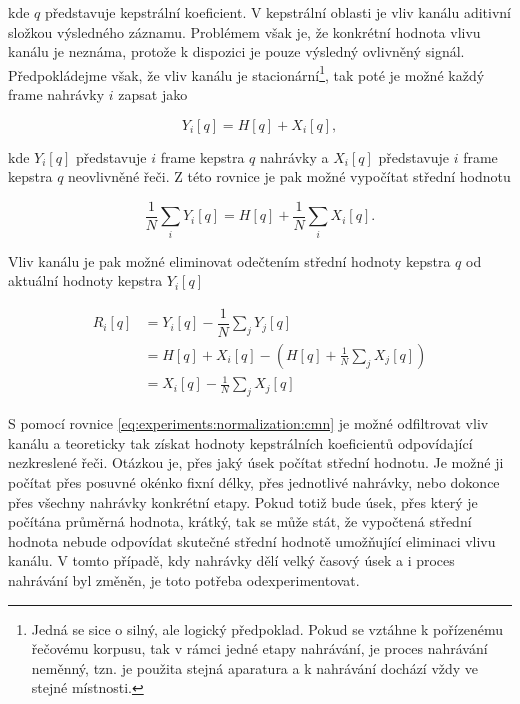 \noindent kde $q$ představuje kepstrální koeficient. V kepstrální oblasti je vliv kanálu aditivní složkou výsledného záznamu. Problémem však je, že konkrétní hodnota vlivu kanálu je neznáma, protože k dispozici je pouze výsledný ovlivněný signál. Předpokládejme však, že vliv kanálu je stacionární\footnote{Jedná se sice o silný, ale logický předpoklad. Pokud se vztáhne k pořízenému řečovému korpusu, tak v rámci jedné etapy nahrávání, je proces nahrávání neměnný, tzn. je použita stejná aparatura a k nahrávání dochází vždy ve stejné místnosti.}, tak poté je možné každý frame nahrávky $i$ zapsat jako

\begin{equation}
  Y_i\left[q\right] = H\left[q\right] + X_i\left[q\right],
\end{equation}

\noindent kde $Y_i\left[q\right]$ představuje $i$ frame kepstra $q$ nahrávky a $X_i\left[q\right]$ představuje $i$ frame kepstra $q$ neovlivněné řeči. Z této rovnice je pak možné vypočítat střední hodnotu

\begin{equation}
  \frac{1}{N} \sum_i Y_i\left[q\right] = H\left[q\right] + \frac{1}{N} \sum_i X_i\left[q\right].
\end{equation}

\noindent Vliv kanálu je pak možné eliminovat odečtením střední hodnoty kepstra $q$ od aktuální hodnoty kepstra $Y_i\left[q\right]$

\begin{align}
  R_i\left[q\right] &= Y_i\left[q\right] - \dfrac{1}{N}\sum_{j} Y_j\left[q\right] \nonumber  \\
  &= H\left[q\right] + X_i\left[q\right] - \left( H\left[q\right] + \frac{1}{N} \sum_j X_j\left[q\right] \right) \nonumber  \\
  &= X_i\left[q\right] - \frac{1}{N} \sum_j X_j\left[q\right]
  \label{eq:experiments:normalization:cmn}
\end{align}

\noindent S pomocí rovnice \ref{eq:experiments:normalization:cmn} je možné odfiltrovat vliv kanálu a teoreticky tak získat hodnoty kepstrálních koeficientů odpovídající nezkreslené řeči. Otázkou je, přes jaký úsek počítat střední hodnotu. Je možné ji počítat přes posuvné okénko fixní délky, přes jednotlivé nahrávky, nebo dokonce přes všechny nahrávky konkrétní etapy. Pokud totiž bude úsek, přes který je počítána průměrná hodnota, krátký, tak se může stát, že vypočtená střední hodnota nebude odpovídat skutečné střední hodnotě umožňující eliminaci vlivu kanálu. V tomto případě, kdy nahrávky dělí velký časový úsek a i proces nahrávání byl změněn, je toto potřeba odexperimentovat.

